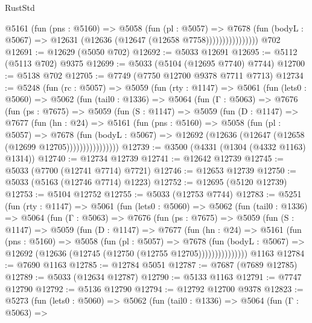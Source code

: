 \begin{lexlean}{RustStd}
\begin{coremodule}
                      @5161
                        (fun (pns : @5160) =>
                        @5058
                          (fun (pl : @5057) =>
                          @7678
                            (fun (bodyL : @5067) =>
                            @12631 (@12636 (@12647 (@12658 @7758))))))))))))))))
    @702
@12691 := @12629 (@5050 @702)
@12692 := @5033 @12691
@12695 := @5112 (@5113 @702) @9375
@12699 := @5033 (@5104 (@12695 @7740) @7744)
@12700 := @5138 @702
@12705 := @7749 (@7750 @12700 @9378 @7711 @7713)
@12734 := @5248
    (fun (rc : @5057) =>
    @5059
      (fun (rty : @1147) =>
      @5061
        (fun (lets0 : @5060) =>
        @5062
          (fun (tail0 : @1336) =>
          @5064
            (fun (Γ : @5063) =>
            @7676
              (fun (ps : @7675) =>
              @5059
                (fun (S : @1147) =>
                @5059
                  (fun (D : @1147) =>
                  @7677
                    (fun (hn : @24) =>
                    @5161
                      (fun (pns : @5160) =>
                      @5058
                        (fun (pl : @5057) =>
                        @7678
                          (fun (bodyL : @5067) =>
                          @12692 (@12636 (@12647 (@12658 (@12699 @12705))))))))))))))))
@12739 := @3500 (@4331 (@1304 (@4332 @1163) @1314))
@12740 := @12734 @12739
@12741 := @12642 @12739
@12745 := @5033 (@7700 (@12741 @7714) @7721)
@12746 := @12653 @12739
@12750 := @5033 (@5163 (@12746 @7714) @1223)
@12752 := @12695 (@5120 @12739)
@12753 := @5104 @12752
@12755 := @5033 (@12753 @7744)
@12783 := @5251
    (fun (rty : @1147) =>
    @5061
      (fun (lets0 : @5060) =>
      @5062
        (fun (tail0 : @1336) =>
        @5064
          (fun (Γ : @5063) =>
          @7676
            (fun (ps : @7675) =>
            @5059
              (fun (S : @1147) =>
              @5059
                (fun (D : @1147) =>
                @7677
                  (fun (hn : @24) =>
                  @5161
                    (fun (pns : @5160) =>
                    @5058
                      (fun (pl : @5057) =>
                      @7678
                        (fun (bodyL : @5067) =>
                        @12692 (@12636 (@12745 (@12750 (@12755 @12705)))))))))))))))
    @1163
@12784 := @7690 @1163
@12785 := @12784 @5051
@12787 := @7687 (@7689 @12785)
@12789 := @5033 (@12634 @12787)
@12790 := @5133 @1163
@12791 := @7747 @12790
@12792 := @5136 @12790
@12794 := @12792 @12700 @9378
@12823 := @5273
    (fun (lets0 : @5060) =>
    @5062
      (fun (tail0 : @1336) =>
      @5064
        (fun (Γ : @5063) =>

\end{coremodule}
\end{lexlean}
